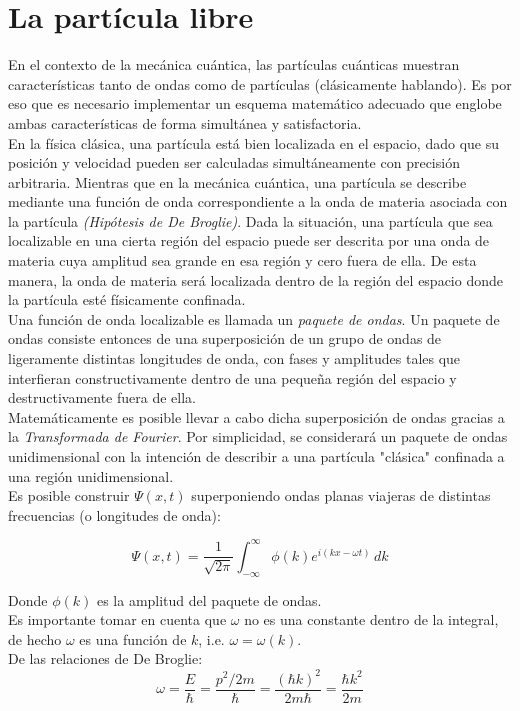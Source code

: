 \section{La partícula libre}
\label{La partícula libre}

En el contexto de la mecánica cuántica, las partículas cuánticas muestran características tanto de ondas como de
partículas (clásicamente hablando). Es por eso que es necesario implementar un esquema matemático adecuado que englobe
ambas características de forma simultánea y satisfactoria.\\
En la física clásica, una partícula está bien localizada en el espacio, dado que su posición y velocidad pueden ser
calculadas simultáneamente con precisión arbitraria. Mientras que en la mecánica cuántica, una partícula se describe
mediante una función de onda correspondiente a la onda de materia asociada con la partícula \emph{(Hipótesis de De Broglie)}.
Dada la situación, una partícula que sea localizable en una cierta región del espacio puede ser descrita por una onda de materia
cuya amplitud sea grande en esa región y cero fuera de ella. De esta manera, la onda de materia será localizada dentro
de la región del espacio donde la partícula esté físicamente confinada.\\
Una función de onda localizable es llamada un \emph{paquete de ondas}. Un paquete de ondas consiste entonces de una
superposición de un grupo de ondas de ligeramente distintas longitudes de onda, con fases y amplitudes tales que
interfieran constructivamente dentro de una pequeña región del espacio y destructivamente fuera de ella.\\

Matemáticamente es posible llevar a cabo dicha superposición de ondas gracias a la \emph{Transformada de Fourier}. Por
simplicidad, se considerará un paquete de ondas unidimensional con la intención de describir a una partícula "clásica"
confinada a una región unidimensional.\\
Es posible construir $\Psi(x,t)$ superponiendo ondas planas viajeras de distintas frecuencias (o longitudes de onda):

\begin{equation}
    \Psi(x,t) = \frac{1}{\sqrt{2\pi}} \int_{-\infty}^{\infty} \phi(k)e^{i(kx-\omega t)}\,dk
\end{equation}

Donde $\phi(k)$ es la amplitud del paquete de ondas.\\
Es importante tomar en cuenta que $\omega$ no es una constante dentro de la integral, de hecho $\omega$ es una función de
$k$, i.e. $\omega=\omega(k)$.\\
De las relaciones de De Broglie:
\begin{equation*}
    \omega = \frac{E}{\hbar} = \frac{p^2/2m}{\hbar} = \frac{(\hbar k)^2}{2m\hbar} = \frac{\hbar k^2}{2m}
\end{equation*}

